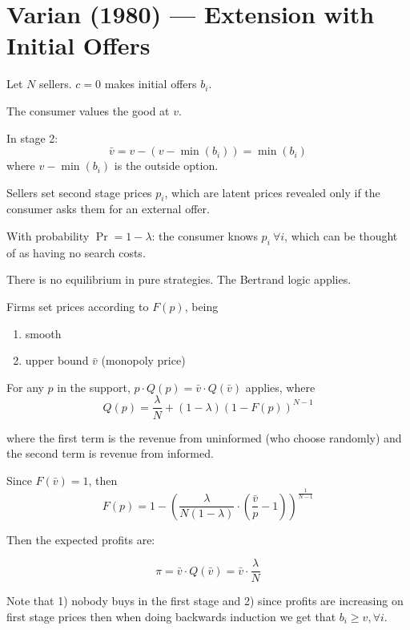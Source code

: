 \documentclass[12pt]{article}
\theoremstyle{plain}
\theoremstyle{plain}
\begin{document}
 



\section*{Varian (1980) --- Extension with Initial Offers}

Let $N$ sellers. $c=0$ makes initial offers $b_i$.

The consumer values the good at $v$.

In stage 2:
\[
\bar{v} = v - (v - \min(b_i)) = \min(b_i)
\]
where $v - \min(b_i)$ is the outside option. 

Sellers set second stage prices $p_i$, which are latent prices revealed only if the consumer asks them for an external offer.

With probability $\Pr = 1- \lambda$: the consumer knows $p_i\ \forall i$, which can be thought of as having no search costs.

There is no equilibrium in pure strategies. The Bertrand logic applies.


 Firms set prices according to $F(p)$, being
\begin{enumerate}
    \item smooth
    \item upper bound $\bar{v} $ (monopoly price)
\end{enumerate}

For any $p$ in the support, $p \cdot Q(p) = \bar{v} \cdot Q(\bar{v})$ applies, where
\[
Q(p) = \frac{\lambda}{N} + (1 - \lambda) \left(1 - F(p)\right)^{N-1}
\]

where the first term is the revenue from uninformed (who choose randomly) and the second term is revenue from informed. 


Since $F(\bar{v}) = 1$, then
\[
F(p) = 1 - \left( \frac{ \lambda}{N (1- \lambda)} \cdot \left( \frac{\bar{v}}{p} - 1 \right) \right)^{\frac{1}{N-1}}
\]

Then the expected profits are: 

\[
\pi =  \bar{v} \cdot Q(\bar{v})=  \bar{v} \cdot \frac{\lambda}{N}
\]

Note that 1) nobody buys in the first stage and 2) since profits are increasing on first stage prices then when doing backwards induction we get that $b_i \geq v, \forall i$. 
\end{document}
